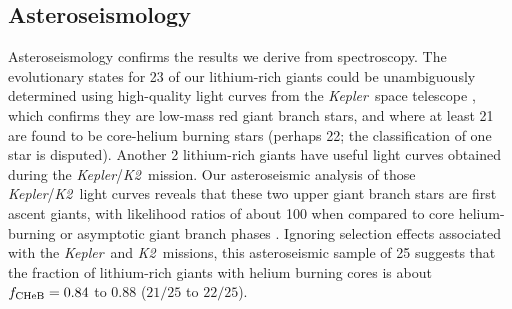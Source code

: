\documentclass[twocolumn]{aastex62}
\newcommand\lamost{LAMOST}
\newcommand{\project}[1]{\emph{#1}}
\newcommand{\kepler}{\project{Kepler}}
\newcommand{\ktwo}{\project{K2}}
\begin{document}
 













\subsection{Asteroseismology} %



Asteroseismology confirms the results we derive from spectroscopy. 
The evolutionary states for 23 of our lithium-rich giants could be unambiguously determined
using high-quality light 
curves from the \kepler\ space telescope \citep[Figure~\ref{fig:figure1}c;][]{Mosser_2012,Stello_2013,Vrard_2016}, 
which confirms they are low-mass red giant branch stars, and where at 
least 21 are found to be core-helium burning stars (perhaps 22; the classification of one star is disputed).
Another 2 lithium-rich giants have useful light curves obtained during the \kepler/\ktwo\ mission. 
Our asteroseismic analysis of those \kepler/\ktwo\ light curves reveals that these two upper giant 
branch stars are first ascent giants, with likelihood ratios of about 100 when compared to core
helium-burning or asymptotic giant branch phases \citep{Hekker_2017}. Ignoring selection effects associated with the \kepler\ and \ktwo\ missions, this asteroseismic sample of 25 suggests that the fraction of lithium-rich giants with helium burning cores is about $f_{\rm CHeB} = 0.84$ to $0.88$ ($21/25$ to $22/25$).
 
\end{document}
